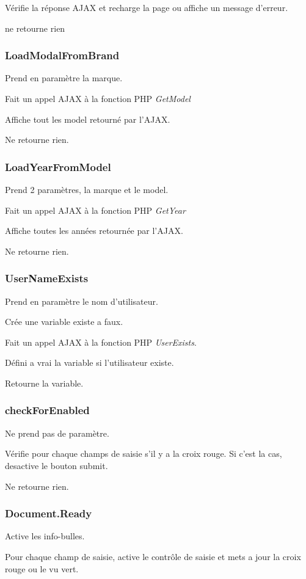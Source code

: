 \documentclass[a4paper]{article}
\begin{document}
Vérifie la réponse AJAX et recharge la page ou affiche un message d'erreur.

ne retourne rien 

\subsubsection{LoadModalFromBrand}
Prend en paramètre la marque.

Fait un appel AJAX à la fonction PHP \emph{GetModel}

Affiche tout les model retourné par l'AJAX.

Ne retourne rien.

\subsubsection{LoadYearFromModel}
Prend 2 paramètres, la marque et le model.

Fait un appel AJAX à la fonction PHP \emph{GetYear}

Affiche toutes les années retournée par l'AJAX.

Ne retourne rien.

\subsubsection{UserNameExists}
Prend en paramètre le nom d'utilisateur.

Crée une variable existe a faux.

Fait un appel AJAX à la fonction PHP \emph{UserExists}.

Défini a vrai la variable si l'utilisateur existe.

Retourne la variable.

\subsubsection{checkForEnabled}
Ne prend pas de paramètre.

Vérifie pour chaque champs de saisie s'il y a la croix rouge. Si c'est la cas, desactive le bouton submit.

Ne retourne rien.

\subsubsection{Document.Ready}
Active les info-bulles.

Pour chaque champ de saisie, active le contrôle de saisie et mets a jour la croix rouge ou le vu vert.
\end{document}
